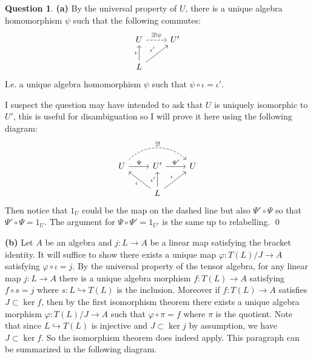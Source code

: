 \documentclass[10.5pt]{article}
\theoremstyle{definition}
\newtheorem{pb}{Question}
\numberwithin{example}{subsection}
\numberwithin{proposition}{subsection}
\begin{document}
    \begin{pb}
        \textbf{(a)} By the universal property of \(U\), there is a unique algebra homomorphism \(\psi\) such that the following commutes:
        \begin{equation}
            \begin{tikzcd}
                U \arrow[r, dashed, "\exists ! \psi"] &U' \\
                L \arrow[u,"\iota"] \arrow[ur,"\iota'"]
            \end{tikzcd}
        \end{equation}
        I.e. a unique algebra homomorphism \(\psi\) such that \(\psi \circ \iota = \iota'\). 
        
        I suspect the question may have intended to ask that \(U\) is uniquely isomorphic to \(U'\), this is useful for disambiguation so I will prove it here using the following diagram:
        \begin{equation}\begin{tikzcd}
            U \arrow[rr,bend left = 45,dashed,"\exists !"] \arrow[r,"\Psi"] &U' \arrow[r,"\Psi'"] &U \\
            & L \arrow[ru,"\iota"] \arrow[lu,"\iota"] \arrow[u,"\iota'"]
        \end{tikzcd}\end{equation}
        Then notice that \(1_U\) could be the map on the dashed line but also \(\Psi'\circ\Psi\) so that \(\Psi'\circ\Psi = 1_U\). The argument for \(\Psi\circ\Psi' = 1_{U'}\) is the same up to relabelling.
        \qed

        \textbf{(b)} Let \(A\) be an algebra and \(j: L \to A\) be a linear map satisfying the bracket identity. It will suffice to show there exists a unique map \(\varphi: T(L)/J \to A\) satisfying \(\varphi \circ \iota = j\). By the universal property of the tensor algebra, for any linear map \(j: L \to A\) there is a unique algebra morphism \(f: T(L) \to A\) satisfying \(f \circ s = j\) where \(s: L \hookrightarrow T(L)\) is the inclusion. Moreover if \(f: T(L) \to A\) satisfies \(J \subset \ker f\), then by the first isomorphism theorem there exists a unique algebra morphism \(\varphi: T(L)/J \to A\) such that  \(\varphi \circ \pi = f\) where \(\pi\) is the quotient. Note that since \(L \hookrightarrow T(L)\) is injective and \(J \subset \ker j\) by assumption, we have \(J \subset \ker f\). So the isomorphism theorem does indeed apply. This paragraph can be summarized in the following diagram.


\end{pb}
\end{document}
